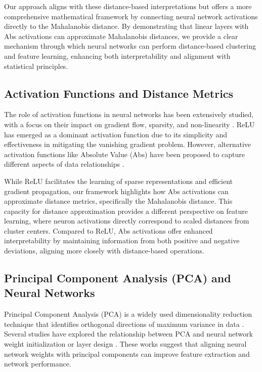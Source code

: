 Our approach aligns with these distance-based interpretations but offers a more comprehensive mathematical framework by connecting neural network activations directly to the Mahalanobis distance. By demonstrating that linear layers with Abs activations can approximate Mahalanobis distances, we provide a clear mechanism through which neural networks can perform distance-based clustering and feature learning, enhancing both interpretability and alignment with statistical principles.

\subsection{Activation Functions and Distance Metrics}

The role of activation functions in neural networks has been extensively studied, with a focus on their impact on gradient flow, sparsity, and non-linearity \citep{glorot2010understanding, lecun2012efficient}. ReLU has emerged as a dominant activation function due to its simplicity and effectiveness in mitigating the vanishing gradient problem. However, alternative activation functions like Absolute Value (Abs) have been proposed to capture different aspects of data relationships \citep{ramachandran2017searching}.

While ReLU facilitates the learning of sparse representations and efficient gradient propagation, our framework highlights how Abs activations can approximate distance metrics, specifically the Mahalanobis distance. This capacity for distance approximation provides a different perspective on feature learning, where neuron activations directly correspond to scaled distances from cluster centers. Compared to ReLU, Abs activations offer enhanced interpretability by maintaining information from both positive and negative deviations, aligning more closely with distance-based operations.

\subsection{Principal Component Analysis (PCA) and Neural Networks}

Principal Component Analysis (PCA) is a widely used dimensionality reduction technique that identifies orthogonal directions of maximum variance in data \citep{jolliffe2002principal}. Several studies have explored the relationship between PCA and neural network weight initialization or layer design \citep{lee2007learning, tashiro2016generalized}. These works suggest that aligning neural network weights with principal components can improve feature extraction and network performance.

